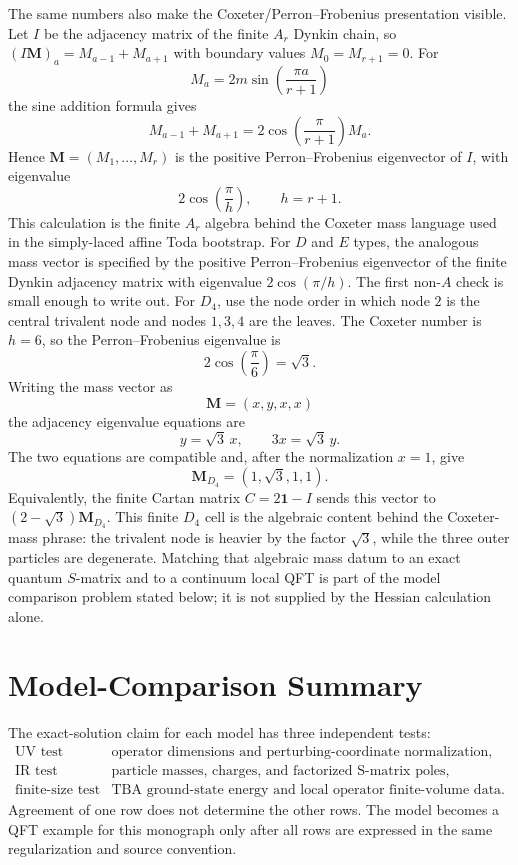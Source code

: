The same numbers also make the Coxeter/Perron--Frobenius presentation
visible.  Let \(I\) be the adjacency matrix of the finite \(A_r\) Dynkin
chain, so \((I\mathbf M)_a=M_{a-1}+M_{a+1}\) with boundary values
\(M_0=M_{r+1}=0\).  For
\[
  M_a=2m\sin\!\left(\frac{\pi a}{r+1}\right)
\]
the sine addition formula gives
\[
  M_{a-1}+M_{a+1}
  =
  2\cos\!\left(\frac{\pi}{r+1}\right)M_a .
\]
Hence \(\mathbf M=(M_1,\ldots,M_r)\) is the positive
Perron--Frobenius eigenvector of \(I\), with eigenvalue
\[
  2\cos\!\left(\frac{\pi}{h}\right),
  \qquad h=r+1 .
\]
This calculation is the finite \(A_r\) algebra behind the Coxeter mass
language used in the simply-laced affine Toda bootstrap.  For \(D\) and \(E\)
types, the analogous mass vector is specified by the positive
Perron--Frobenius eigenvector of the finite Dynkin adjacency matrix with
eigenvalue \(2\cos(\pi/h)\).  The first non-\(A\) check is small enough to
write out.  For \(D_4\), use the node order in which node \(2\) is the central
trivalent node and nodes \(1,3,4\) are the leaves.  The Coxeter number is
\(h=6\), so the Perron--Frobenius eigenvalue is
\[
  2\cos\!\left(\frac{\pi}{6}\right)=\sqrt3 .
\]
Writing the mass vector as
\[
  \mathbf M=(x,y,x,x)
\]
the adjacency eigenvalue equations are
\[
  y=\sqrt3\,x,
  \qquad
  3x=\sqrt3\,y .
\]
The two equations are compatible and, after the normalization \(x=1\), give
\[
  \mathbf M_{D_4}=(1,\sqrt3,1,1).
\]
Equivalently, the finite Cartan matrix \(C=2\mathbf 1-I\) sends this vector to
\((2-\sqrt3)\mathbf M_{D_4}\).  This finite \(D_4\) cell is the algebraic
content behind the Coxeter-mass phrase: the trivalent node is heavier by the
factor \(\sqrt3\), while the three outer particles are degenerate.  Matching
that algebraic mass datum to an exact quantum \(S\)-matrix and to a continuum
local QFT is part of the model comparison problem stated below; it is not
supplied by the Hessian calculation alone.

\section{Model-Comparison Summary}

The exact-solution claim for each model has three independent tests:
\[
\begin{array}{ll}
\text{UV test} & \text{operator dimensions and perturbing-coordinate
normalization},\\
\text{IR test} & \text{particle masses, charges, and factorized S-matrix
poles},\\
\text{finite-size test} & \text{TBA ground-state energy and local operator
finite-volume data}.
\end{array}
\]
Agreement of one row does not determine the other rows.  The model becomes a
QFT example for this monograph only after all rows are expressed in the same
regularization and source convention.

